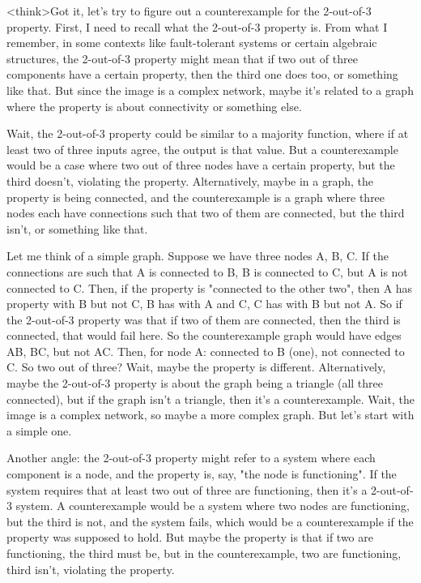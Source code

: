 <think>Got it, let's try to figure out a counterexample for the 2-out-of-3 property. First, I need to recall what the 2-out-of-3 property is. From what I remember, in some contexts like fault-tolerant systems or certain algebraic structures, the 2-out-of-3 property might mean that if two out of three components have a certain property, then the third one does too, or something like that. But since the image is a complex network, maybe it's related to a graph where the property is about connectivity or something else.

Wait, the 2-out-of-3 property could be similar to a majority function, where if at least two of three inputs agree, the output is that value. But a counterexample would be a case where two out of three nodes have a certain property, but the third doesn't, violating the property. Alternatively, maybe in a graph, the property is being connected, and the counterexample is a graph where three nodes each have connections such that two of them are connected, but the third isn't, or something like that.

Let me think of a simple graph. Suppose we have three nodes A, B, C. If the connections are such that A is connected to B, B is connected to C, but A is not connected to C. Then, if the property is "connected to the other two", then A has property with B but not C, B has with A and C, C has with B but not A. So if the 2-out-of-3 property was that if two of them are connected, then the third is connected, that would fail here. So the counterexample graph would have edges AB, BC, but not AC. Then, for node A: connected to B (one), not connected to C. So two out of three? Wait, maybe the property is different. Alternatively, maybe the 2-out-of-3 property is about the graph being a triangle (all three connected), but if the graph isn't a triangle, then it's a counterexample. Wait, the image is a complex network, so maybe a more complex graph. But let's start with a simple one.

Another angle: the 2-out-of-3 property might refer to a system where each component is a node, and the property is, say, "the node is functioning". If the system requires that at least two out of three are functioning, then it's a 2-out-of-3 system. A counterexample would be a system where two nodes are functioning, but the third is not, and the system fails, which would be a counterexample if the property was supposed to hold. But maybe the property is that if two are functioning, the third must be, but in the counterexample, two are functioning, third isn't, violating the property.

